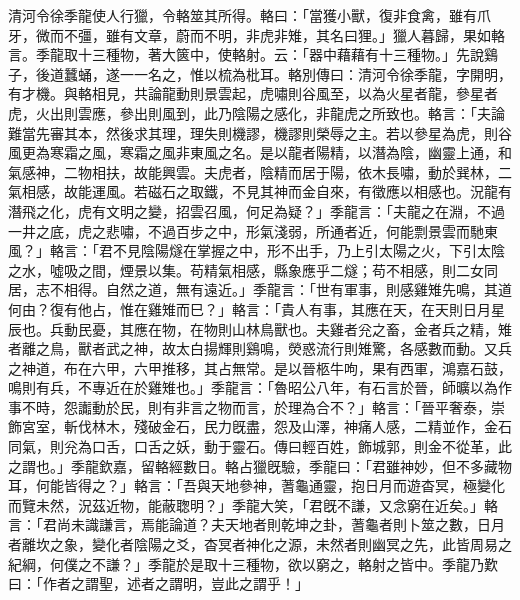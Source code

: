 \begin{pinyinscope}
清河令徐季龍使人行獵，令輅筮其所得。輅曰：「當獲小獸，復非食禽，雖有爪牙，微而不彊，雖有文章，蔚而不明，非虎非雉，其名曰狸。」獵人暮歸，果如輅言。季龍取十三種物，著大篋中，使輅射。云：「器中藉藉有十三種物。」先說鷄子，後道蠶蛹，遂一一名之，惟以梳為枇耳。輅別傳曰：清河令徐季龍，字開明，有才機。與輅相見，共論龍動則景雲起，虎嘯則谷風至，以為火星者龍，參星者虎，火出則雲應，參出則風到，此乃陰陽之感化，非龍虎之所致也。輅言：「夫論難當先審其本，然後求其理，理失則機謬，機謬則榮辱之主。若以參星為虎，則谷風更為寒霜之風，寒霜之風非東風之名。是以龍者陽精，以潛為陰，幽靈上通，和氣感神，二物相扶，故能興雲。夫虎者，陰精而居于陽，依木長嘯，動於巽林，二氣相感，故能運風。若磁石之取鐵，不見其神而金自來，有徵應以相感也。況龍有潛飛之化，虎有文明之變，招雲召風，何足為疑？」季龍言：「夫龍之在淵，不過一井之底，虎之悲嘯，不過百步之中，形氣淺弱，所通者近，何能剽景雲而馳東風？」輅言：「君不見陰陽燧在掌握之中，形不出手，乃上引太陽之火，下引太陰之水，噓吸之間，煙景以集。苟精氣相感，縣象應乎二燧；苟不相感，則二女同居，志不相得。自然之道，無有遠近。」季龍言：「世有軍事，則感雞雉先鳴，其道何由？復有他占，惟在雞雉而巳？」輅言：「貴人有事，其應在天，在天則日月星辰也。兵動民憂，其應在物，在物則山林鳥獸也。夫雞者兊之畜，金者兵之精，雉者離之鳥，獸者武之神，故太白揚輝則鷄鳴，熒惑流行則雉驚，各感數而動。又兵之神道，布在六甲，六甲推移，其占無常。是以晉柩牛呴，果有西軍，鴻嘉石鼓，鳴則有兵，不專近在於雞雉也。」季龍言：「魯昭公八年，有石言於晉，師曠以為作事不時，怨讟動於民，則有非言之物而言，於理為合不？」輅言：「晉平奢泰，崇飾宮室，斬伐林木，殘破金石，民力旣盡，怨及山澤，神痛人感，二精並作，金石同氣，則兊為口舌，口舌之妖，動于靈石。傳曰輕百姓，飾城郭，則金不從革，此之謂也。」季龍欽嘉，留輅經數日。輅占獵旣驗，季龍曰：「君雖神妙，但不多藏物耳，何能皆得之？」輅言：「吾與天地參神，蓍龜通靈，抱日月而遊杳冥，極變化而覽未然，況茲近物，能蔽聦明？」季龍大笑，「君旣不謙，又念窮在近矣。」輅言：「君尚未識謙言，焉能論道？夫天地者則乾坤之卦，蓍龜者則卜筮之數，日月者離坎之象，變化者陰陽之爻，杳冥者神化之源，未然者則幽冥之先，此皆周易之紀綱，何僕之不謙？」季龍於是取十三種物，欲以窮之，輅射之皆中。季龍乃歎曰：「作者之謂聖，述者之謂明，豈此之謂乎！」


\end{pinyinscope}
